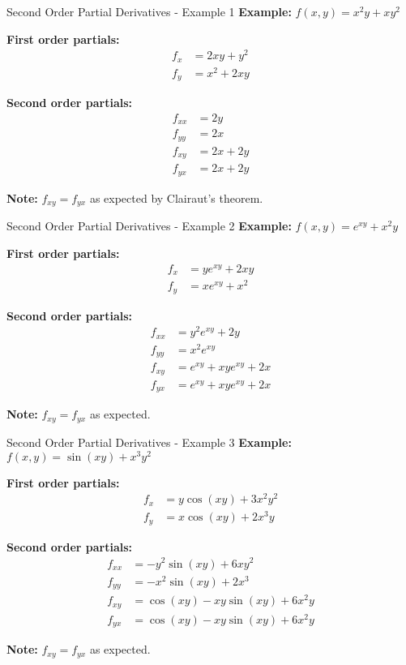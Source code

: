 \documentclass[aspectratio=169]{beamer}
\begin{document}
\begin{frame}{Second Order Partial Derivatives - Example 1}
\textbf{Example:} $f(x,y) = x^2y + xy^2$

\textbf{First order partials:}
\begin{align*}
    f_x &= 2xy + y^2 \\
    f_y &= x^2 + 2xy
\end{align*}

\textbf{Second order partials:}
\begin{align*}
    f_{xx} &= 2y \\
    f_{yy} &= 2x \\
    f_{xy} &= 2x + 2y \\
    f_{yx} &= 2x + 2y
\end{align*}

\textbf{Note:} $f_{xy} = f_{yx}$ as expected by Clairaut's theorem.
\end{frame}

\begin{frame}{Second Order Partial Derivatives - Example 2}
\textbf{Example:} $f(x,y) = e^{xy} + x^2y$

\textbf{First order partials:}
\begin{align*}
    f_x &= ye^{xy} + 2xy \\
    f_y &= xe^{xy} + x^2
\end{align*}

\textbf{Second order partials:}
\begin{align*}
    f_{xx} &= y^2e^{xy} + 2y \\
    f_{yy} &= x^2e^{xy} \\
    f_{xy} &= e^{xy} + xye^{xy} + 2x \\
    f_{yx} &= e^{xy} + xye^{xy} + 2x
\end{align*}

\textbf{Note:} $f_{xy} = f_{yx}$ as expected.
\end{frame}

\begin{frame}{Second Order Partial Derivatives - Example 3}
\textbf{Example:} $f(x,y) = \sin(xy) + x^3y^2$

\textbf{First order partials:}
\begin{align*}
    f_x &= y\cos(xy) + 3x^2y^2 \\
    f_y &= x\cos(xy) + 2x^3y
\end{align*}

\textbf{Second order partials:}
\begin{align*}
    f_{xx} &= -y^2\sin(xy) + 6xy^2 \\
    f_{yy} &= -x^2\sin(xy) + 2x^3 \\
    f_{xy} &= \cos(xy) - xy\sin(xy) + 6x^2y \\
    f_{yx} &= \cos(xy) - xy\sin(xy) + 6x^2y
\end{align*}

\textbf{Note:} $f_{xy} = f_{yx}$ as expected.
\end{frame}
\end{document}
